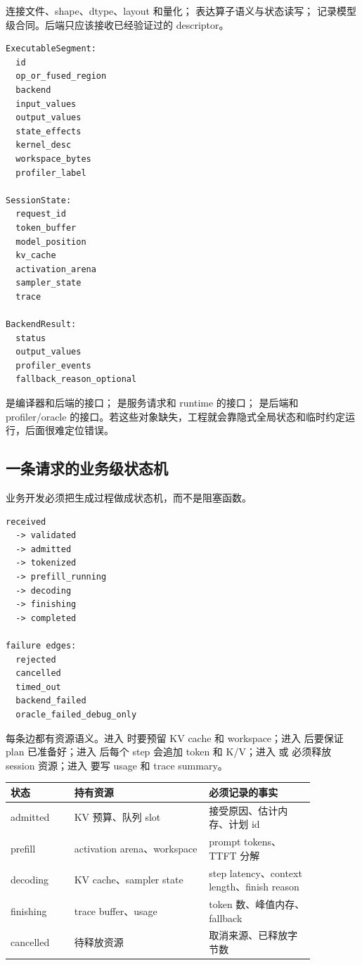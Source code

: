  连接文件、shape、dtype、layout 和量化； 表达算子语义与状态读写； 记录模型级合同。后端只应该接收已经验证过的 descriptor。

\begin{lstlisting}[numbers=none,caption={运行时与后端的核心合同}]
ExecutableSegment:
  id
  op_or_fused_region
  backend
  input_values
  output_values
  state_effects
  kernel_desc
  workspace_bytes
  profiler_label

SessionState:
  request_id
  token_buffer
  model_position
  kv_cache
  activation_arena
  sampler_state
  trace

BackendResult:
  status
  output_values
  profiler_events
  fallback_reason_optional
\end{lstlisting}

 是编译器和后端的接口； 是服务请求和 runtime 的接口； 是后端和 profiler/oracle 的接口。若这些对象缺失，工程就会靠隐式全局状态和临时约定运行，后面很难定位错误。

\subsection{一条请求的业务级状态机}

业务开发必须把生成过程做成状态机，而不是阻塞函数。

\begin{lstlisting}[numbers=none,caption={推理请求状态机}]
received
  -> validated
  -> admitted
  -> tokenized
  -> prefill_running
  -> decoding
  -> finishing
  -> completed

failure edges:
  rejected
  cancelled
  timed_out
  backend_failed
  oracle_failed_debug_only
\end{lstlisting}

每条边都有资源语义。进入  时要预留 KV cache 和 workspace；进入  后要保证 plan 已准备好；进入  后每个 step 会追加 token 和 K/V；进入  或  必须释放 session 资源；进入  要写 usage 和 trace summary。

\begin{center}
\begin{tabular}{p{0.18\linewidth}p{0.38\linewidth}p{0.30\linewidth}}
\toprule
状态 & 持有资源 & 必须记录的事实 \\
\midrule
admitted & KV 预算、队列 slot & 接受原因、估计内存、计划 id \\
prefill & activation arena、workspace & prompt tokens、TTFT 分解 \\
decoding & KV cache、sampler state & step latency、context length、finish reason \\
finishing & trace buffer、usage & token 数、峰值内存、fallback \\
cancelled & 待释放资源 & 取消来源、已释放字节数 \\
\bottomrule
\end{tabular}
\end{center}

